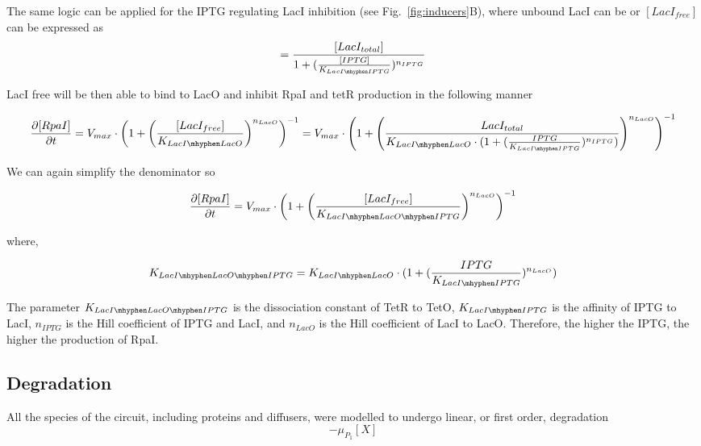 The same logic can be applied for the IPTG regulating LacI inhibition (see Fig.~\ref{fig:inducers}B),
where unbound LacI can be or $[LacI_{free}]$ can be expressed as
\begin{equation}
[LacI{free}] =  \frac{[LacI_{total}]}{1+(\frac{[IPTG]}{K_{LacI \mhyphen IPTG}})^{n_{IPTG}}}
\end{equation}

LacI free will be then able to bind to LacO and inhibit RpaI and tetR production in the following manner

\begin{equation}
    \pdv{[RpaI]}{t} = V_{max}\cdot \left(1+\left(\frac{[LacI_{free}]}{K_{LacI \mhyphen LacO}}\right)^{n_{LacO}}\right)^{-1} = V_{max} \cdot \left(1+\left(\frac{LacI_{total}}{K_{LacI \mhyphen LacO}\cdot(1+(\frac{IPTG}{K_{LacI \mhyphen IPTG}})^{n_{IPTG}})}\right)^{n_{LacO}}\right)^{-1}
\end{equation}


We can again simplify the denominator so

\begin{equation}
    \pdv{[RpaI]}{t} = V_{max}\cdot \left(1+\left(\frac{[LacI_{free}]}{K_{LacI \mhyphen LacO \mhyphen IPTG }}\right)^{n_{LacO}}\right)^{-1}
\end{equation}

where,

\begin{equation}
    K_{LacI \mhyphen LacO \mhyphen IPTG} = K_{LacI \mhyphen LacO}\cdot(1+(\frac{IPTG}{K_{LacI \mhyphen IPTG}})^{n_{LacO}})
\end{equation}

The parameter $K_{LacI \mhyphen LacO \mhyphen IPTG}$ is the dissociation constant of TetR to TetO, $K_{LacI \mhyphen IPTG}$
is the affinity of IPTG to LacI, $n_{IPTG}$ is the Hill coefficient of IPTG and LacI,
and $n_{LacO}$ is the Hill coefficient of LacI to LacO.
Therefore, the higher the IPTG, the higher the production of RpaI.




\subsection{Degradation}
All the species of the circuit, including proteins and diffusers,
were modelled to undergo linear, or first order, degradation
\begin{equation}
    -\mu_{P_{1}}[X]
    \label{linear degradation}
\end{equation}


